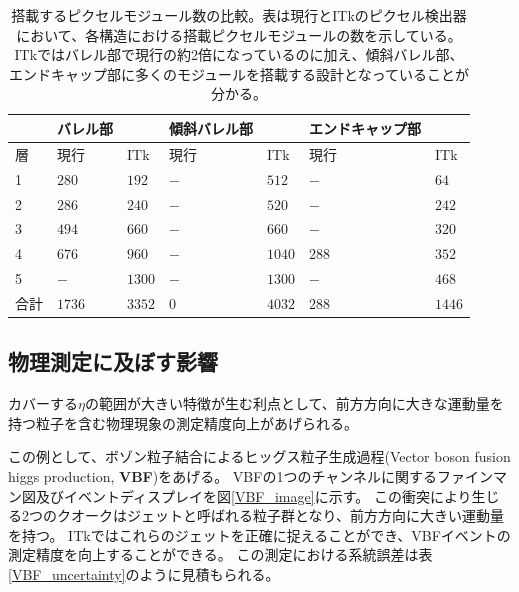 \begin{table}[tbp]
\begin{center}
\caption[搭載するピクセルモジュール数の比較]{搭載するピクセルモジュール数の比較。表は現行とITkのピクセル検出器において、各構造における搭載ピクセルモジュールの数を示している。ITkではバレル部で現行の約2倍になっているのに加え、傾斜バレル部、エンドキャップ部に多くのモジュールを搭載する設計となっていることが分かる。}
\label{compare_itk_modules}
  \begin{tabular}{|l||ll|ll|ll|} \hline
          & バレル部 &            & 傾斜バレル部 & & エンドキャップ部 & \\ \hline 
    層    & 現行     & ITk        & 現行& ITk          & 現行  & ITk \\ \hline
    1     & $280$    & $192$      & $-$ & $512$        & $-$   & $64$ \\ 
    2     & $286$    & $240$      & $-$ & $520$        & $-$   & $242$ \\ 
    3     & $494$    & $660$      & $-$ & $660$        & $-$   & $320$ \\ 
    4     & $676$    & $960$      & $-$ & $1040$       & $288$ & $352$ \\ 
    5     & $-$      & $1300$     & $-$ & $1300$       & $-$   & $468$ \\ \hline
    合計  & $1736$   & $3352$     & $0$ & $4032$       & $288$ & $1446$ \\ \hline\hline
  \end{tabular}
\end{center}
\end{table}

\subsection{物理測定に及ぼす影響}
カバーする$\eta$の範囲が大きい特徴が生む利点として、前方方向に大きな運動量を持つ粒子を含む物理現象の測定精度向上があげられる。

この例として、ボゾン粒子結合によるヒッグス粒子生成過程(Vector boson fusion higgs production, \textbf{VBF})をあげる。
VBFの1つのチャンネルに関するファインマン図及びイベントディスプレイを図\ref{VBF_image}に示す。
この衝突により生じる2つのクオークはジェットと呼ばれる粒子群となり、前方方向に大きい運動量を持つ。
ITkではこれらのジェットを正確に捉えることができ、VBFイベントの測定精度を向上することができる。
この測定における系統誤差は表\ref{VBF_uncertainty}のように見積もられる\cite{1-3}。

